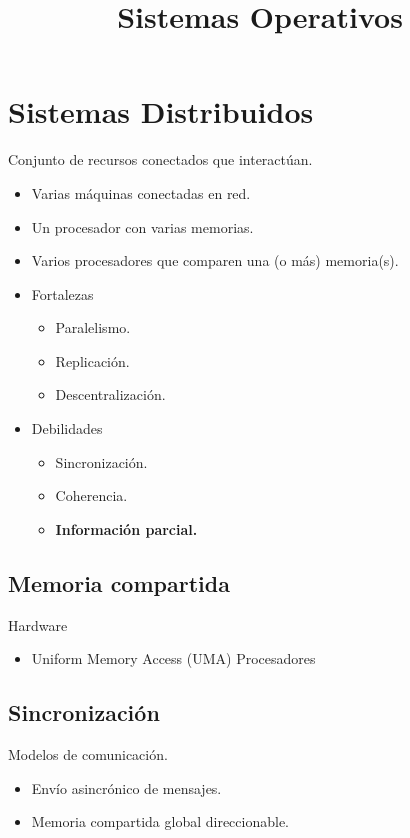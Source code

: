 \documentclass[11pt, spanish]{report}
\title{Sistemas Operativos}
\date{}
\begin{document}
\maketitle

\chapter{Sistemas Distribuidos}

Conjunto de recursos conectados que interactúan.
\begin{itemize}
  \item Varias máquinas conectadas en red.
  \item Un procesador con varias memorias.
  \item Varios procesadores que comparen una (o más) memoria(s).
\end{itemize}

\begin{itemize}
  \item Fortalezas \begin{itemize}
      \item Paralelismo.
      \item Replicación.
      \item Descentralización.
    \end{itemize}
  \item Debilidades \begin{itemize}
      \item Sincronización.
      \item Coherencia.
      \item \textbf{Información parcial.}
    \end{itemize}
\end{itemize}

\section{Memoria compartida}

Hardware
\begin{itemize}
\item Uniform Memory Access (UMA) Procesadores 
\end{itemize}


\section{Sincronización}

Modelos de comunicación.
\begin{itemize}
  \item Envío asincrónico de mensajes.
  \item Memoria compartida global direccionable.
\end{itemize}
\end{document}
